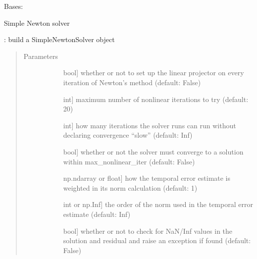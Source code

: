 \documentclass[letterpaper,10pt,english]{sphinxmanual}
\begin{document}
\begin{fulllineitems}
\label{\detokenize{spitfire.time.nonlinear:spitfire.time.nonlinear.SimpleNewtonSolver}}
Bases: {\hyperref[\detokenize{spitfire.time.nonlinear:spitfire.time.nonlinear.NonlinearSolver}]{}}

Simple Newton solver

: build a SimpleNewtonSolver object
\begin{quote}\begin{description}
\item[{Parameters}] \leavevmode\begin{description}
\item[{}] \leavevmode{[}bool{]}
whether or not to set up the linear projector on every iteration of Newton’s method (default: False)

\item[{}] \leavevmode{[}int{]}
maximum number of nonlinear iterations to try (default: 20)

\item[{}] \leavevmode{[}int{]}
how many iterations the solver runs can run without declaring convergence “slow” (default: Inf)

\item[{}] \leavevmode{[}bool{]}
whether or not the solver must converge to a solution within max\_nonlinear\_iter (default: False)

\item[{}] \leavevmode{[}np.ndarray or float{]}
how the temporal error estimate is weighted in its norm calculation (default: 1)

\item[{}] \leavevmode{[}int or np.Inf{]}
the order of the norm used in the temporal error estimate (default: Inf)

\item[{}] \leavevmode{[}bool{]}
whether or not to check for NaN/Inf values in the solution and residual and raise an exception if found (default: False)


\end{description}
\end{description}
\end{quote}
\end{fulllineitems}
\end{document}
